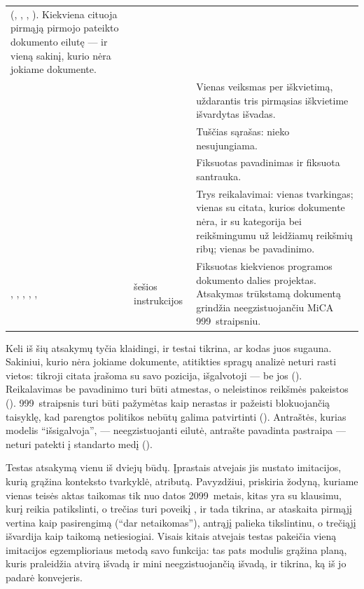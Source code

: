 \begin{xltabular}{\textwidth}{@{}L{33mm}L{39mm}Y@{}}
(, , , ). Kiekviena cituoja pirmąją pirmojo
pateikto dokumento eilutę --- ir vieną sakinį, kurio nėra jokiame dokumente. \\
 &  &
Vienas veiksmas per iškvietimą, uždarantis tris pirmąsias iškvietime išvardytas išvadas. \\
 &  & Tuščias sąrašas: nieko nesujungiama. \\
 &  & Fiksuotas pavadinimas ir fiksuota santrauka. \\
 &  &
Trys reikalavimai: vienas tvarkingas; vienas su citata, kurios dokumente nėra, ir su kategorija
bei reikšmingumu už leidžiamų reikšmių ribų; vienas be pavadinimo. \\
, , , , ,
 & šešios  instrukcijos &
Fiksuotas kiekvienos programos dokumento dalies projektas. Atsakymas  trūkstamą
dokumentą grindžia neegzistuojančiu MiCA 999~straipsniu. \\
\end{xltabular}

Keli iš šių atsakymų tyčia klaidingi, ir testai tikrina, ar kodas juos sugauna. Sakiniui,
kurio nėra jokiame dokumente, atitikties spragų analizė neturi rasti vietos: tikroji citata
įrašoma su savo pozicija, išgalvotoji --- be jos (). Reikalavimas
be pavadinimo turi būti atmestas, o neleistinos reikšmės pakeistos ().
999~straipsnis turi būti pažymėtas kaip nerastas ir pažeisti blokuojančią taisyklę, kad
parengtos politikos nebūtų galima patvirtinti (). Antraštės, kurias
modelis \enquote{išsigalvoja}, --- neegzistuojanti eilutė, antrašte pavadinta pastraipa --- neturi
patekti į standarto medį ().

Testas atsakymą  vienu iš dviejų būdų. Įprastais atvejais jis nustato
imitacijos, kurią grąžina konteksto tvarkyklė, atributą. Pavyzdžiui,
 priskiria  žodyną, kuriame vienas teisės
aktas taikomas tik nuo datos 2099~metais, kitas yra  su klausimu, kurį reikia
patikslinti, o trečias turi poveikį , ir tada tikrina, ar ataskaita pirmąjį
vertina kaip pasirengimą (\enquote{dar netaikomas}), antrąjį palieka tikslintinu, o trečiąjį
išvardija kaip taikomą netiesiogiai. Visais kitais atvejais testas pakeičia vieną imitacijos
egzemplioriaus metodą savo funkcija: tas pats modulis grąžina planą, kuris praleidžia atvirą
išvadą ir mini neegzistuojančią išvadą, ir tikrina, ką iš jo padarė konvejeris.

